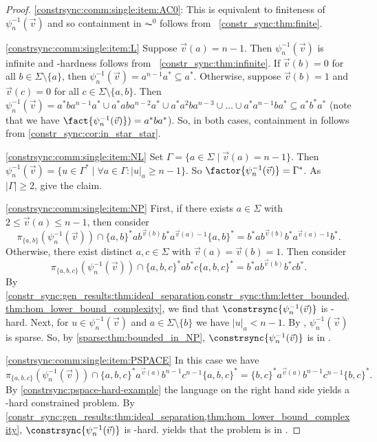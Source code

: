 \begin{proof}
\ref{constrsync:comm:single:item:AC0}: This is equivalent
to finiteness of $\psi_n^{-1}(\vec{v})$
and so containment in $\AC^0$ 
follows from \THM~\ref{constr_sync:thm:finite}. 

\ref{constrsync:comm:single:item:L} Suppose $\vec{v}(a) = n - 1$. 
 Then $\psi_n^{-1}(\vec{v})$
 is infinite and \LOGSPACE-hardness follows from \THM~\ref{constr_sync:thm:infinite}.
 If $\vec{v}(b) = 0$ for all $b \in \Sigma \setminus \{a\}$,
 then $\psi_n^{-1}(\vec{v}) = a^{n-1}a^* \subseteq a^*$. 
 Otherwise, suppose $\vec{v}(b) = 1$
 and $\vec{v}(c) = 0$ for all $c \in \Sigma \setminus \{a,b\}$.
 Then 
 $\psi_n^{-1}(\vec{v}) = a^*ba^{n-1}a^* \cup a^*aba^{n-2}a^* \cup a^*a^2ba^{n-3} \cup \ldots \cup a^*a^{n-1}ba^* \subseteq a^* b^* a^*$ (note that we have $\fact{\psi_n^{-1}(\vec{v})}) = a^* b a^*$).
 So, in both cases, containment in \LOGSPACE
 follows from \cref{constr_sync:cor:in_star_star}.
 
 
\ref{constrsync:comm:single:item:NL} Set $\Gamma = \{ a \in \Sigma \mid \vec{v}(a) = n - 1 \}$.  Then
 $\psi_n^{-1}(\vec{v}) = \{ u \in \Gamma^* \mid \forall a \in \Gamma \colon |u|_a \ge n - 1 \}$.
 So $\factor{\psi_n^{-1}(\vec{v})} = \Gamma^*$.
 As $|\Gamma| \ge 2$,
 give the claim.
  
\ref{constrsync:comm:single:item:NP}
  First, if there exists $a \in \Sigma$ with $2 \le \vec{v}(a) \le n - 1$,
  then consider
  \[
  \pi_{\{a,b\}}(\psi_n^{-1}(\vec{v})) \cap \{a,b\}^* a b^{\vec{v}(b)} b^* a^{\vec{v}(a)-1} \{a,b\}^* = b^* a b^{\vec{v}(b)}b^* a^{\vec{v}(a)-1} b^*. 
  \]
  Otherwise, there exist distinct $a,c \in \Sigma$ with $\vec{v}(a) = \vec{v}(b) = 1$.
  Then consider 
   \[
  \pi_{\{a,b,c\}}(\psi_n^{-1}(\vec{v})) \cap \{a,b,c\}^* a b^* c \{a,b,c\}^* = b^* a b^{\vec{v}(b)}b^* c b^*. 
  \]
  By \cref{constr_sync:gen_results:thm:ideal_separation,constr_sync:thm:letter_bounded,thm:hom_lower_bound_complexity},
  we find that $\constrsync{\psi_n^{-1}(\vec{v})}$ is \NP-hard.
  Next, for $u \in \psi_n^{-1}(\vec{v})$ and $a \in \Sigma \setminus \{b\}$
  we have $|u|_a < n - 1$.
  By , 
  $\psi_n^{-1}(\vec{v})$ is sparse.
  So, by \cref{sparse:thm:bounded_in_NP}, 
  $\constrsync{\psi_n^{-1}(\vec{v})}$ is in \NP.
  
\ref{constrsync:comm:single:item:PSPACE} In this case we have 
\[
\pi_{\{a,b,c\}}(\psi_n^{-1}(\vec{v})) \cap \{a,b,c\}^* a^{\vec{v}(a)} b^{n-1} c^{n-1}\{a,b,c\}^* = \{b,c\}^* a^{\vec{v}(a)} b^{n-1} c^{n-1} \{b,c\}^*.
\]
By \cref{constrsync:pspace-hard-example} 
the language on the right hand side yields a \PSPACE-hard constrained problem.
By \cref{constr_sync:gen_results:thm:ideal_separation,thm:hom_lower_bound_complexity}, $\constrsync{\psi_n^{-1}(\vec{v})}$ is \PSPACE-hard.
 yields that the problem is in \PSPACE. 	
\end{proof}

